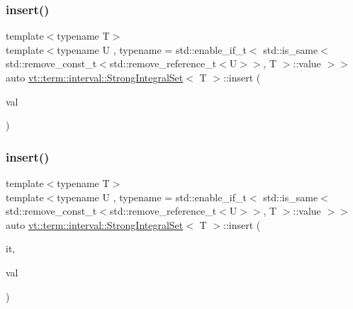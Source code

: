 \mbox{\label{structvt_1_1term_1_1interval_1_1_strong_integral_set_acf0af5ef186ca47969641b5ce134a623}} 
\subsubsection{\texorpdfstring{insert()}{insert()}\hspace{0.1cm}{\footnotesize\ttfamily [1/2]}}
{\footnotesize\ttfamily template$<$typename T$>$ \\
template$<$typename U , typename  = std\+::enable\+\_\+if\+\_\+t$<$      std\+::is\+\_\+same$<$        std\+::remove\+\_\+const\+\_\+t$<$std\+::remove\+\_\+reference\+\_\+t$<$\+U$>$$>$, T      $>$\+::value    $>$$>$ \\
auto \hyperlink{structvt_1_1term_1_1interval_1_1_strong_integral_set}{vt\+::term\+::interval\+::\+Strong\+Integral\+Set}$<$ T $>$\+::insert (\begin{DoxyParamCaption}\item[{U \&\&}]{val }\end{DoxyParamCaption})\hspace{0.3cm}{\ttfamily [inline]}}

\mbox{\label{structvt_1_1term_1_1interval_1_1_strong_integral_set_a7692cfd426582b6ebd722c6c9a6370ec}} 
\subsubsection{\texorpdfstring{insert()}{insert()}\hspace{0.1cm}{\footnotesize\ttfamily [2/2]}}
{\footnotesize\ttfamily template$<$typename T$>$ \\
template$<$typename U , typename  = std\+::enable\+\_\+if\+\_\+t$<$      std\+::is\+\_\+same$<$        std\+::remove\+\_\+const\+\_\+t$<$std\+::remove\+\_\+reference\+\_\+t$<$\+U$>$$>$, T      $>$\+::value    $>$$>$ \\
auto \hyperlink{structvt_1_1term_1_1interval_1_1_strong_integral_set}{vt\+::term\+::interval\+::\+Strong\+Integral\+Set}$<$ T $>$\+::insert (\begin{DoxyParamCaption}\item[{typename \hyperlink{structvt_1_1term_1_1interval_1_1_integral_set_base_a111b2ec1ea960a40ba4270be702f11f1}{Set\+Type\+::\+Iterator\+Type}}]{it,  }\item[{U \&\&}]{val }\end{DoxyParamCaption})\hspace{0.3cm}{\ttfamily [inline]}}

